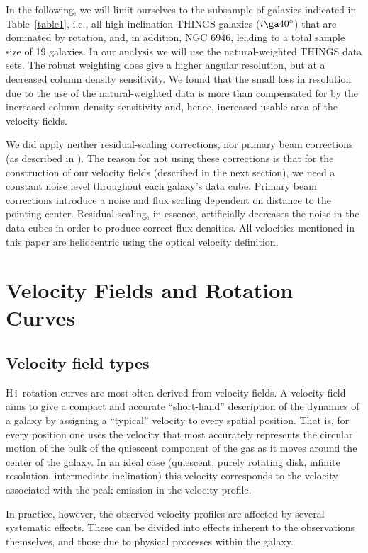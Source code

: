 \documentclass[usenatbib,usegraphicx,apjfonts,floatfix]{emulateapj}
\newcommand{\HI}{H\,{\sc i}}
\begin{document}
In the following, we will limit ourselves to the subsample of galaxies
indicated in Table~\ref{table1}, i.e., all high-inclination THINGS
galaxies ($i \ga 40^{\circ}$) that are dominated by rotation, and, in
addition, NGC 6946, leading to a total sample size of 19 galaxies.  In
our analysis we will use the natural-weighted THINGS data sets.  The
robust weighting does give a higher angular resolution, but at a
decreased column density sensitivity. We found that the small loss in
resolution due to the use of the natural-weighted data is more than
compensated for by the increased column density sensitivity and,
hence, increased usable area of the velocity fields.

We did apply neither residual-scaling corrections, nor primary beam
corrections (as described in \citealt{THINGS1}). The reason for not
using these corrections is that for the construction of our velocity
fields (described in the next section), we need a constant noise level
throughout each galaxy's data cube. Primary beam corrections introduce
a noise and flux scaling dependent on distance to the pointing
center. Residual-scaling, in essence, artificially decreases the noise
in the data cubes in order to produce correct flux densities.  All
velocities mentioned in this paper are heliocentric using the optical
velocity definition.

\section{Velocity Fields and Rotation Curves}

\subsection{Velocity field types\label{sect:velfi}}

\HI\ rotation curves are most often derived from velocity fields. A
velocity field aims to give a compact and accurate ``short-hand''
description of the dynamics of a galaxy by assigning a ``typical''
velocity to every spatial position. That is, for every position one
uses the velocity that most accurately represents the
circular motion of the bulk of the quiescent component of the gas as
it moves around the center of the galaxy.  In an ideal case
(quiescent, purely rotating disk, infinite resolution, intermediate
inclination) this velocity corresponds to the velocity associated with
the peak emission in the velocity profile.

In practice, however, the observed velocity profiles are affected by
several systematic effects. These can be divided into effects inherent
to the observations themselves, and those due to physical processes
within the galaxy.
\end{document}
